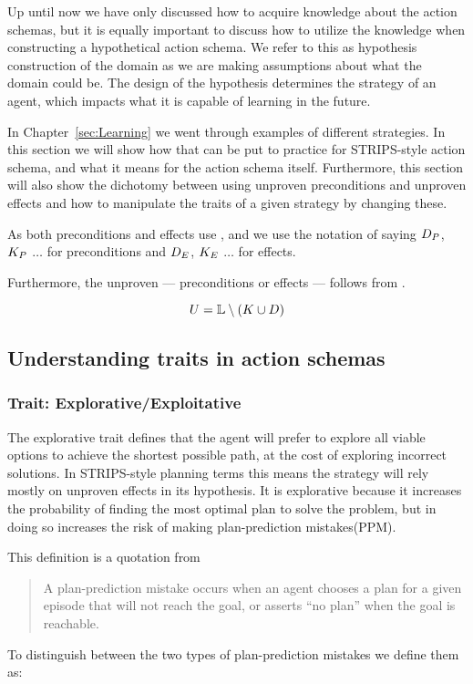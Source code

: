 \documentclass[\master/Master.tex]{subfiles}
\begin{document}
	Up until now we have only discussed how to acquire knowledge about the action schemas, but it is equally important to discuss how to utilize the knowledge when constructing a hypothetical action schema.
	We refer to this as hypothesis construction of the domain as we are making assumptions about what the domain could be.
	The design of the hypothesis determines the strategy of an agent, which impacts what it is capable of learning in the future.

	In Chapter~\ref{sec:Learning} we went through examples of different strategies. In this section we will show how that can be put to practice for STRIPS-style action schema, and what it means for the action schema itself.
	Furthermore, this section will also show the dichotomy between using unproven preconditions and unproven effects and how to manipulate the traits of a given strategy by changing these.

	As both preconditions and effects use \Pro, \Dsp and \Up we use the notation of saying $D_P$, $K_P$ $\dots$ for preconditions and
	$D_E$, $K_E$ $\dots$ for effects.
	
	Furthermore, the unproven \Up --- preconditions or effects --- follows from .
	
	\begin{equation}
		 U = \mathbb{L} \setminus (K \cup D)
	\end{equation}
\subsection{Understanding traits in action schemas}

\subsubsection{Trait: Explorative/Exploitative}

	The explorative trait defines that the agent will prefer to explore all viable options to achieve the shortest possible path, at the cost of exploring incorrect solutions.
	In STRIPS-style planning terms this means the strategy will rely mostly on unproven effects in its hypothesis.
	It is explorative because it increases the probability of finding the most optimal plan to solve the problem,
	but in doing so increases the risk of making plan-prediction mistakes(PPM).
	\begin{definition}[PPM] This definition is a quotation from \cite{Walsh2008}
	\begin{quotation}
				A plan-prediction mistake occurs when an
				agent chooses a plan for a given episode that will not reach
				the goal, or asserts “no plan” when the goal is reachable. 
	\end{quotation}
	\end{definition}
	To distinguish between the two types of plan-prediction mistakes we define them as:
\end{document}
